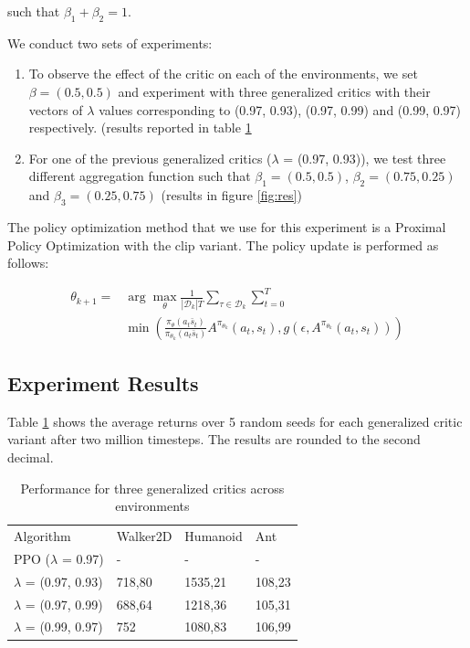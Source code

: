 such that $\beta_1 + \beta_2 = 1$.

We conduct two sets of experiments: 
\begin{enumerate}
\item To observe the effect of the critic on each of the environments, we set $\beta=(0.5, 0.5)$ and experiment with three generalized critics with their vectors of $\lambda$ values corresponding to (0.97, 0.93), (0.97, 0.99) and (0.99, 0.97) respectively. (results reported in table \ref{tab:reslam}
\item For one of the previous generalized critics ($\lambda$ = (0.97, 0.93)), we test three different aggregation function such that $\beta_1 = (0.5, 0.5)$, $\beta_2 = (0.75, 0.25)$ and $\beta_3 = (0.25, 0.75)$ (results in figure \ref{fig:res})
\end{enumerate}

The policy optimization method that we use for this experiment is a Proximal Policy Optimization\cite{schulman2017proximal} with the clip variant. The policy update is performed as follows:

\begin{align*}
\theta_{k+1} = & \arg \max_{\theta} \frac{1}{| \mathcal{D}_k | T} \sum_{\tau \in \mathcal{D}_k} \sum_{t=0}^T \\ 
& \min \left(\frac{\pi_{\theta}(a_t\bar s_t)}{\pi_{\theta_k}(a_t\bar s_t)} A^{\pi_{\theta_k}}(a_t, s_t), g(\epsilon, A^{\pi_{\theta_k}}(a_t, s_t))\right)
\end{align*}

\subsection{Experiment Results}

Table \ref{tab:reslam} shows the average returns over 5 random seeds for each generalized critic variant after two million timesteps. The results are rounded to the second decimal.

\begin{table}[!htb]
\begin{tabular}{p{22mm}p{14mm}p{15mm}p{11mm}}
Algorithm & Walker2D & Humanoid & Ant\\
PPO ($\lambda$ = 0.97) & - & - & - \\
\hline
$\lambda$ = (0.97, 0.93) & 718,80 & 1535,21 & 108,23  \\ 
\hline
$\lambda$ = (0.97, 0.99)& 688,64 & 1218,36 & 105,31  \\ 
\hline
$\lambda$ = (0.99, 0.97)& 752 & 1080,83 & 106,99 \\ 
\end{tabular}
\caption{Performance for three generalized critics across environments}
\label{tab:reslam}
\end{table}



